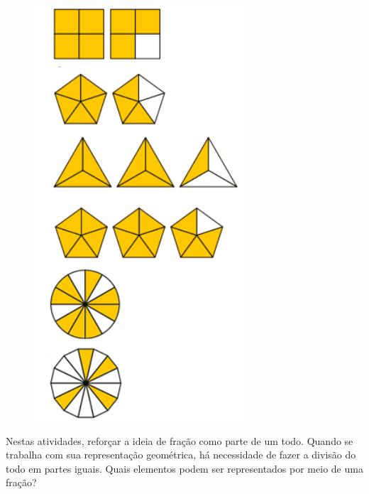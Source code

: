 \begin{figure}
\includegraphics[width=0.7\textwidth]{./imgSAEB_6_MAT/media/image32.png}
\end{figure}

\begin{escolha}
\item {}
\item {}
\item {}
\item {}
\item {}
\item {}
\end{escolha}

\noindent Nestas atividades, reforçar a ideia de fração como parte de um todo.
Quando se trabalha com sua representação geométrica, há necessidade de
fazer a divisão do todo em partes iguais. Quais elementos podem ser representados por meio de uma fração?

